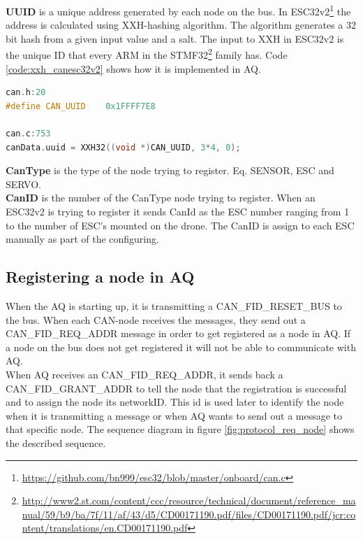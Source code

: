 \textbf{UUID} is a unique address generated by each node on the bus. In ESC32v2\footnote{\url{https://github.com/bn999/esc32/blob/master/onboard/can.c}} the address is calculated using XXH-hashing algorithm. The algorithm generates a 32 bit hash from a given input value and a salt.
The input to XXH in ESC32v2 is the unique ID that every ARM in the STMF32\footnote{\url{http://www2.st.com/content/ccc/resource/technical/document/reference_manual/59/b9/ba/7f/11/af/43/d5/CD00171190.pdf/files/CD00171190.pdf/jcr:content/translations/en.CD00171190.pdf}}
 family has. Code \ref{code:xxh_canesc32v2} shows how it is implemented in AQ.

\begin{lstlisting}[language = c, caption = Snippet showing UUID generated in ESC32v2, label=code:xxh_canesc32v2]
can.h:20
#define CAN_UUID	0x1FFFF7E8

can.c:753
canData.uuid = XXH32((void *)CAN_UUID, 3*4, 0);
\end{lstlisting}

\textbf{CanType} is the type of the node trying to register. Eq. SENSOR, ESC and SERVO.  \\

\textbf{CanID} is the number of the CanType node trying to register. When an ESC32v2 is trying to register it sends CanId as the ESC number ranging from 1 to the number of ESC's mounted on the drone. The CanID is assign to each ESC manually as part of the configuring.

\renewcommand{\mess}[4][0]{
  \stepcounter{seqlevel}
  \path
  (#2)+(0,-\theseqlevel*\unitfactor-0.7*\unitfactor) node (mess from) {};
  \addtocounter{seqlevel}{#1}
  \path
  (#4)+(0,-\theseqlevel*\unitfactor-0.7*\unitfactor) node (mess to) {};
  \draw[->,>=angle 60] (mess from) -- (mess to) node[midway, above]
  {#3};
}

\subsection{Registering a node in AQ}\label{sec:reg_aq_node}

When the AQ is starting up, it is transmitting a CAN\_FID\_RESET\_BUS to the bus.
When each CAN-node receives the messages, they send out a CAN\_FID\_REQ\_ADDR message in order to get registered as a node in AQ.
If a node on the bus does not get registered it will not be able to communicate with AQ. \\
When AQ receives an CAN\_FID\_REQ\_ADDR, it sends back a CAN\_FID\_GRANT\_ADDR to tell the node that the registration is successful and to assign the node its networkID.
This id is used later to identify the node when it is transmitting a message or when AQ wants to send out a message to that specific node.
The sequence diagram in figure \ref{fig:protocol_req_node} shows the described sequence.

